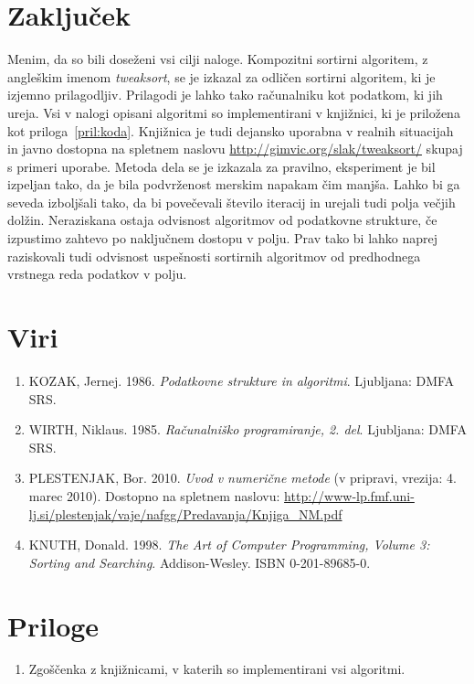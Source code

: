 \documentclass[a4paper,oneside,12pt]{article}
\begin{document}
\section{Zaključek}
Menim, da so bili doseženi vsi cilji naloge. Kompozitni sortirni algoritem, z
angleškim imenom \emph{tweaksort}, se je izkazal za odličen sortirni algoritem,
ki je izjemno prilagodljiv. Prilagodi je lahko tako računalniku kot podatkom, ki
jih ureja. Vsi v nalogi opisani algoritmi so implementirani v
knjižnici, ki je priložena kot priloga~\ref{pril:koda}. 
Knjižnica je tudi dejansko uporabna v realnih situacijah in javno dostopna na spletnem
naslovu \url{http://gimvic.org/slak/tweaksort/} skupaj s primeri uporabe. Metoda dela se je izkazala za
pravilno, eksperiment je bil izpeljan tako, da je bila podvrženost merskim 
napakam čim manjša. Lahko bi ga seveda izboljšali tako, da bi povečevali 
število iteracij in urejali tudi polja večjih dolžin. Neraziskana ostaja  
odvisnost algoritmov od podatkovne strukture, če izpustimo
zahtevo po naključnem dostopu v polju. Prav tako bi lahko naprej raziskovali tudi
odvisnost uspešnosti sortirnih algoritmov od predhodnega vrstnega reda podatkov v polju.
\pagebreak

\section{Viri}
\begin{enumerate}
  \item KOZAK, Jernej. 1986. \emph{Podatkovne strukture in algoritmi}. Ljubljana: DMFA SRS.
  \item WIRTH, Niklaus. 1985. \emph{Računalniško programiranje, 2. del}. Ljubljana: DMFA SRS.
  \item PLESTENJAK, Bor. 2010. \emph{Uvod v numerične
    metode} (v pripravi, vrezija: 4. marec 2010).
    Dostopno na spletnem naslovu: \url{http://www-lp.fmf.uni-lj.si/plestenjak/vaje/nafgg/Predavanja/Knjiga_NM.pdf}
  \item KNUTH, Donald. 1998. \emph{The Art of Computer Programming, Volume 3: Sorting and
    Searching}. Addison-Wesley. ISBN 0-201-89685-0.
\end{enumerate}


\section{Priloge}
\begin{enumerate}
  \item \label{pril:koda} Zgoščenka z knjižnicami, v katerih so implementirani
    vsi algoritmi.
\end{enumerate}
\end{document}
